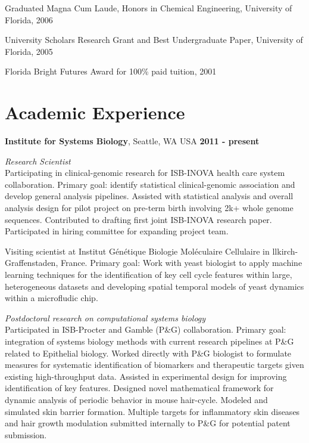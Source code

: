 \documentclass[margin,line]{res}
\begin{document}
\begin{resume}
\vspace*{-2.5mm}
Graduated Magna Cum Laude, Honors in Chemical Engineering, University of Florida, 2006

\vspace*{-2.5mm}
University Scholars Research Grant and Best Undergraduate Paper, University of Florida, 2005

\vspace*{-2.5mm}
Florida Bright Futures Award for 100\% paid tuition, 2001



\section{\sc Academic Experience}
{\bf Institute for Systems Biology}, Seattle, WA USA \hfill {\bf 2011 - present}

{\em Research Scientist}\\
Participating in clinical-genomic research  
for ISB-INOVA health care system collaboration.
Primary goal: identify statistical clinical-genomic association 
and develop general analysis pipelines. 
Assisted with statistical analysis and overall analysis design for pilot 
project on pre-term birth involving 2k+ whole genome sequences.
Contributed to drafting first joint ISB-INOVA research paper.
Participated in hiring committee for expanding project team. 

Visiting scientist at Institut Génétique Biologie Moléculaire Cellulaire
in llkirch-Graffenstaden, France. 
Primary goal: Work with yeast biologist to apply machine learning techniques for the identification of 
key cell cycle features within large, heterogeneous datasets and 
developing spatial temporal models of yeast dynamics within a microfludic chip. 

{\em Postdoctoral research on computational systems biology}\\
Participated in ISB-Procter and Gamble (P\&G) collaboration.  
Primary goal: integration of systems biology methods with current research pipelines at P\&G
related to Epithelial biology.
Worked directly with P\&G biologist to formulate measures 
for systematic identification of biomarkers and therapeutic targets
given existing high-throughput data.
Assisted in experimental design for improving identification of key features.
Designed novel mathematical framework for dynamic analysis of periodic behavior in mouse hair-cycle.
Modeled and simulated skin barrier formation.
Multiple targets for inflammatory skin diseases and hair growth 
modulation submitted internally to P\&G for potential patent submission.




\end{resume}
\end{document}
